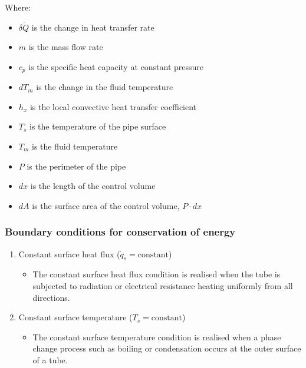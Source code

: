 \documentclass[11pt]{article}
\begin{document}
Where:
\begin{itemize}
\item \(\delta \dot{Q}\) is the change in heat transfer rate
\item \(\dot{m}\) is the mass flow rate
\item \(c_p\) is the specific heat capacity at constant pressure
\item \(dT_m\) is the change in the fluid temperature
\item \(h_x\) is the local convective heat transfer coefficient
\item \(T_s\) is the temperature of the pipe surface
\item \(T_m\) is the fluid temperature
\item \(P\) is the perimeter of the pipe
\item \(dx\) is the length of the control volume
\item \(dA\) is the surface area of the control volume, \(P \cdot dx\)
\end{itemize}
\subsubsection{Boundary conditions for conservation of energy}
\label{sec:orgd3a8ae8}
\begin{enumerate}
\item Constant surface heat flux (\(\dot{q}_s = \text{constant}\))
\begin{itemize}
\item The constant surface heat flux condition is realised when the tube is subjected to radiation or electrical resistance heating uniformly from all directions.
\end{itemize}
\item Constant surface temperature (\(T_s = \text{constant}\))
\begin{itemize}
\item The constant surface temperature condition is realised when a phase change process such as boiling or condensation occurs at the outer surface of a tube.
\end{itemize}
\end{enumerate}
\end{document}
